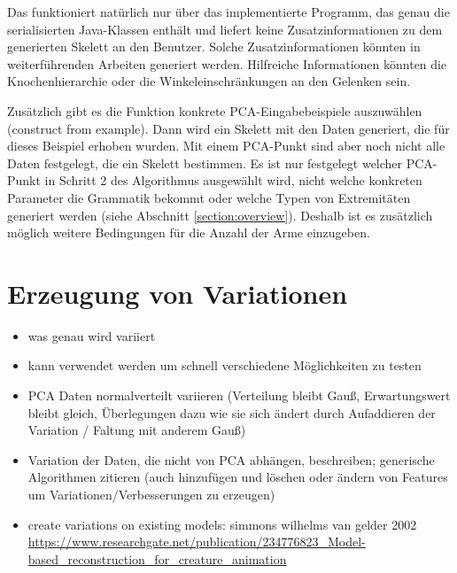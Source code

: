 Das funktioniert natürlich nur über das implementierte Programm, das genau die serialisierten Java-Klassen enthält und liefert keine Zusatzinformationen zu dem generierten Skelett an den Benutzer. Solche Zusatzinformationen könnten in weiterführenden Arbeiten generiert werden. Hilfreiche Informationen könnten \zb die Knochenhierarchie oder die Winkeleinschränkungen an den Gelenken sein.

Zusätzlich gibt es die Funktion konkrete PCA-Eingabebeispiele auszuwählen (construct from example). Dann wird ein Skelett mit den Daten generiert, die für dieses Beispiel erhoben wurden. Mit einem PCA-Punkt sind aber noch nicht alle Daten festgelegt, die ein Skelett bestimmen. Es ist nur festgelegt welcher PCA-Punkt in Schritt 2 des Algorithmus ausgewählt wird, nicht welche konkreten Parameter die Grammatik bekommt oder welche Typen von Extremitäten generiert werden (siehe Abschnitt \ref{section:overview}). Deshalb ist es zusätzlich möglich weitere Bedingungen \zb für die Anzahl der Arme einzugeben.


\section{Erzeugung von Variationen}

\begin{itemize}
 \item was genau wird variiert
 \item kann verwendet werden um schnell verschiedene Möglichkeiten zu testen
 \item PCA Daten normalverteilt variieren (Verteilung bleibt Gauß, Erwartungswert bleibt gleich, Überlegungen dazu wie sie sich ändert durch Aufaddieren der Variation / Faltung mit anderem Gauß)
 \item Variation der Daten, die nicht von PCA abhängen, beschreiben; generische Algorithmen zitieren (auch hinzufügen und löschen oder ändern von Features um Variationen/Verbesserungen zu erzeugen)
 \item create variations on existing models: simmons wilhelms van gelder 2002
	\url{https://www.researchgate.net/publication/234776823_Model-based_reconstruction_for_creature_animation}
\end{itemize}


